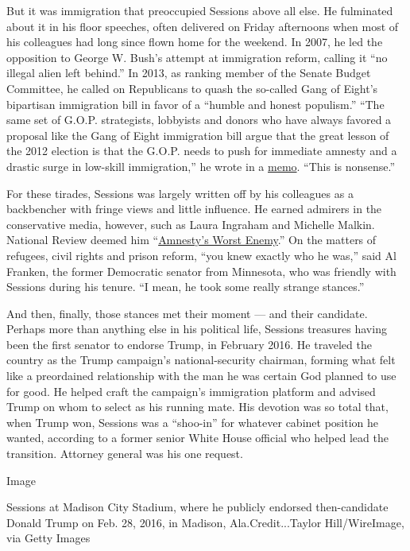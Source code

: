 But it was immigration that preoccupied Sessions above all else. He
fulminated about it in his floor speeches, often delivered on Friday
afternoons when most of his colleagues had long since flown home for the
weekend. In 2007, he led the opposition to George W. Bush's attempt at
immigration reform, calling it ``no illegal alien left behind.'' In
2013, as ranking member of the Senate Budget Committee, he called on
Republicans to quash the so-called Gang of Eight's bipartisan
immigration bill in favor of a ``humble and honest populism.'' ``The
same set of G.O.P. strategists, lobbyists and donors who have always
favored a proposal like the Gang of Eight immigration bill argue that
the great lesson of the 2012 election is that the G.O.P. needs to push
for immediate amnesty and a drastic surge in low-skill immigration,'' he
wrote in a
\href{https://www.washingtonexaminer.com/weekly-standard/sessions-to-republicans-gop-elite-view-on-immigration-is-nonsense}{memo}.
``This is nonsense.''

For these tirades, Sessions was largely written off by his colleagues as
a backbencher with fringe views and little influence. He earned admirers
in the conservative media, however, such as Laura Ingraham and Michelle
Malkin. National Review deemed him
``\href{https://www.nationalreview.com/2014/08/amnestys-worst-enemy-eliana-johnson/}{Amnesty's
Worst Enemy}.'' On the matters of refugees, civil rights and prison
reform, ``you knew exactly who he was,'' said Al Franken, the former
Democratic senator from Minnesota, who was friendly with Sessions during
his tenure. ``I mean, he took some really strange stances.''

And then, finally, those stances met their moment --- and their
candidate. Perhaps more than anything else in his political life,
Sessions treasures having been the first senator to endorse Trump, in
February 2016. He traveled the country as the Trump campaign's
national-security chairman, forming what felt like a preordained
relationship with the man he was certain God planned to use for good. He
helped craft the campaign's immigration platform and advised Trump on
whom to select as his running mate. His devotion was so total that, when
Trump won, Sessions was a ``shoo-in'' for whatever cabinet position he
wanted, according to a former senior White House official who helped
lead the transition. Attorney general was his one request.

Image

Sessions at Madison City Stadium, where he publicly endorsed
then-candidate Donald Trump on Feb. 28, 2016, in Madison,
Ala.Credit...Taylor Hill/WireImage, via Getty Images

